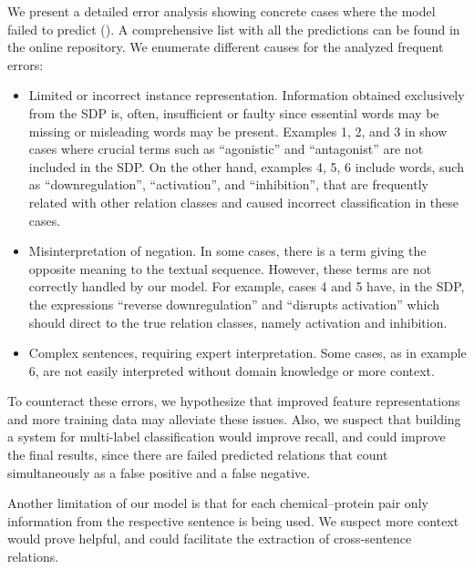 


We present a detailed error analysis showing concrete cases where the model failed to predict ().
A comprehensive list with all the predictions can be found in the online repository.
We enumerate different causes for the analyzed frequent errors:

\begin{itemize}
\item
Limited or incorrect instance representation.
Information obtained exclusively from the SDP is, often, insufficient or faulty since essential words may be missing or misleading words may be present.
Examples 1, 2, and 3 in  show cases where crucial terms such as ``agonistic'' and ``antagonist'' are not included in the SDP.
On the other hand, examples 4, 5, 6 include words, such as ``downregulation'', ``activation'', and ``inhibition'', that are frequently related with other relation classes and caused incorrect classification in these cases.
\item
Misinterpretation of negation.
In some cases, there is a term giving the opposite meaning to the textual sequence.
However, these terms are not correctly handled by our model.
For example, cases 4 and 5 have, in the SDP, the expressions ``reverse downregulation'' and ``disrupts activation'' which should direct to the true relation classes, namely activation and inhibition.
\item
Complex sentences, requiring expert interpretation.
Some cases, as in example 6, are not easily interpreted without domain knowledge or more context.
\end{itemize}



To counteract these errors, we hypothesize that improved feature representations and more training data may alleviate these issues.
Also, we suspect that building a system for multi-label classification would improve recall, and could improve the final results, since there are failed predicted relations that count simultaneously as a false positive and a false negative.

Another limitation of our model is that for each chemical--protein pair only information from the respective sentence is being used.
We suspect more context would prove helpful, and could facilitate the extraction of cross-sentence relations.


